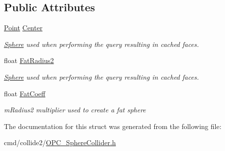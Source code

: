 \subsection*{Public Attributes}
\begin{DoxyCompactItemize}
\item 
\hyperlink{classPoint}{Point} \hyperlink{structSphereCache_aa6ec7c5daea430bac4f5647011ae4707}{Center}\hypertarget{structSphereCache_aa6ec7c5daea430bac4f5647011ae4707}{}\label{structSphereCache_aa6ec7c5daea430bac4f5647011ae4707}

\begin{DoxyCompactList}\small\item\em \hyperlink{classSphere}{Sphere} used when performing the query resulting in cached faces. \end{DoxyCompactList}\item 
float \hyperlink{structSphereCache_a1515c1ca0af84c14fa98c8fac7af8eec}{Fat\+Radius2}\hypertarget{structSphereCache_a1515c1ca0af84c14fa98c8fac7af8eec}{}\label{structSphereCache_a1515c1ca0af84c14fa98c8fac7af8eec}

\begin{DoxyCompactList}\small\item\em \hyperlink{classSphere}{Sphere} used when performing the query resulting in cached faces. \end{DoxyCompactList}\item 
float \hyperlink{structSphereCache_ae4a6ac5ac1ffbfeadacd74e548832f7e}{Fat\+Coeff}\hypertarget{structSphereCache_ae4a6ac5ac1ffbfeadacd74e548832f7e}{}\label{structSphereCache_ae4a6ac5ac1ffbfeadacd74e548832f7e}

\begin{DoxyCompactList}\small\item\em m\+Radius2 multiplier used to create a fat sphere \end{DoxyCompactList}\end{DoxyCompactItemize}


The documentation for this struct was generated from the following file\+:\begin{DoxyCompactItemize}
\item 
cmd/collide2/\hyperlink{OPC__SphereCollider_8h}{O\+P\+C\+\_\+\+Sphere\+Collider.\+h}\end{DoxyCompactItemize}
